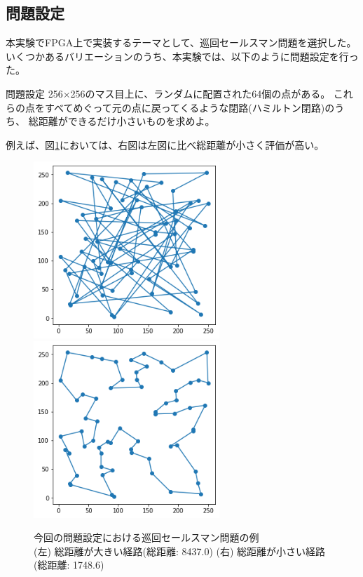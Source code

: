 \subsection{問題設定}
本実験でFPGA上で実装するテーマとして、巡回セールスマン問題を選択した。
いくつかあるバリエーションのうち、本実験では、以下のように問題設定を行った。
\begin{itembox}[l]{問題設定}
    256×256のマス目上に、ランダムに配置された64個の点がある。
    これらの点をすべてめぐって元の点に戻ってくるような閉路(ハミルトン閉路)のうち、
    総距離ができるだけ小さいものを求めよ。
\end{itembox}
例えば、図\ref{fig:tspsapmle}においては、右図は左図に比べ総距離が小さく評価が高い。
\begin{figure}[h]
    \begin{center}
        \includegraphics[width=7cm]{figure/tsp_bad.png}
        \includegraphics[width=7cm]{figure/tsp_good.png}
        \caption{
            今回の問題設定における巡回セールスマン問題の例\\
            (左) 総距離が大きい経路(総距離: 8437.0)
            (右) 総距離が小さい経路(総距離: 1748.6)
        }\label{fig:tspsapmle}
    \end{center}
\end{figure}

